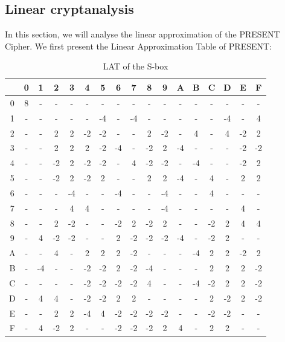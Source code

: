 \documentclass[journal=tosc,preprint]{iacrtrans}
\begin{document}
\subsection{Linear cryptanalysis}
In this section, we will analyse the linear approximation of the PRESENT Cipher. We first present the Linear Approximation Table of PRESENT:\\
\begin{table}[h!]
	\centering
	\caption{LAT of the S-box}
	\begin{tabular}{ |c||c|c|c|c|c|c|c|c|c|c|c|c|c|c|c|c| }
		\hline
		& 0 & 1 & 2 & 3&4& 5& 6&7&8&9&A&B&C&D&E&F  \\ \hline \hline
		0& 8 & - & - & - & - & - & - & - & - & - & - & - & - & - & - & - \\ 
		1& - & - & - & - & - & -4 & - & -4 & - & - & - & - & - & -4 & - & 4 \\
		2& - & - & 2 & 2 & -2 & -2 & - & - & 2 & -2 & - & 4 & - & 4 & -2 & 2 \\
		3& - & - & 2 & 2 & 2 & -2 & -4 & - & -2 & 2 & -4 & - & - & - & -2 & -2 \\
		4& - & - & -2 & 2 & -2 & -2 & - & 4 & -2 & -2 & - & -4 & - & - & -2 & 2 \\
		5 & - & - & -2 & 2 & -2 & 2 & - & - & 2 & 2 & -4 & - & 4 & - & 2 & 2\\
		6 & - & - & - & -4 & - & - & -4 & - & - & -4 & - & - & 4 & - & - & -\\
		7 & - & - & - & 4 & 4 & - & - & - & - & -4 & - & - & - & - & 4 & -\\
		8 & - & - & 2 & -2 & - & - & -2 & 2 & -2 & 2 & - & - & -2 & 2 & 4 & 4\\
		9 & - & 4 & -2 & -2 & - & - & 2 & -2 & -2 & -2 & -4 & - & -2 & 2 & - & -\\
		A & - & - & 4 & - & 2 & 2 & 2 & -2 & - & - & - & -4 & 2 & 2 & -2 & 2\\
		B & - & -4 & - & - & -2 & -2 & 2 & -2 & -4 & - & - & - & 2 & 2 & 2 & -2\\
		C & - & - & - & - & -2 & -2 & -2 & -2 & 4 & - & - & -4 & -2 & 2 & 2 & -2\\
		D & - & 4 & 4 & - & -2 & -2 & 2 & 2 & - & - & - & - & 2 & -2 & 2 & -2\\
		E & - & - & 2 & 2 & -4 & 4 & -2 & -2 & -2 & -2 & - & - & -2 & -2 & - & -\\
		F & - & 4 & -2 & 2 & - & - & -2 & -2 & -2 & 2 & 4 & - & 2 & 2 & - & -\\
		\hline
	\end{tabular}
\end{table}\\
\end{document}
